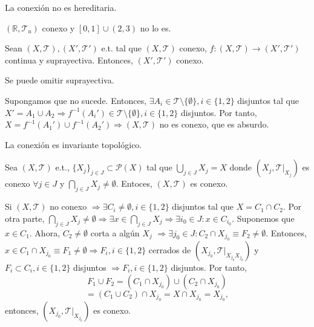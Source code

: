 \begin{obs}
  La conexión no es hereditaria.
\end{obs}

\begin{ejm}
  $( \mathbb{R}, \mathcal{T}_{u} )$ conexo y $[ 0, 1 ] \cup (2, 3)$ no lo es.
\end{ejm}

\begin{prop}
  Sean $( X, \mathcal{T} ), ( X', \mathcal{T}' )$ e.t. tal que $( X, \mathcal{T} )$ conexo, $f : ( X, \mathcal{T} ) \to ( X', \mathcal{T}' )$ continua y suprayectiva. Entonces, $( X', \mathcal{T}' )$ conexo.
\end{prop}

\begin{obs}
  Se puede omitir suprayectiva.
\end{obs}

\begin{dem}
  Supongamos que no sucede. Entonces, $\exists A_{i} \in \mathcal{T} \setminus \{  \emptyset \}, i \in \{ 1, 2 \}$ disjuntos tal que $X' = A_{1} \cup A_{2} \Rightarrow f^{-1}(A_{i}') \in \mathcal{T} \setminus \{  \emptyset \}, i \in \{ 1, 2 \}$ disjuntos. Por tanto, $X = f^{-1}(A_{1}') \cup f^{-1}(A_{2}') \Rightarrow ( X, \mathcal{T} )$ no es conexo, que es absurdo.
\end{dem}

\begin{cor}
  La conexión es invariante topológico.
\end{cor}

\begin{prop}
  Sea $( X, \mathcal{T} )$ e.t., $\{ X_{j} \}_{j \in J} \subset \mathcal{P}(X)$ tal que $\bigcup_{j \in J} X_{j} = X$ donde $( X_{j}, \mathcal{T}|_{X_{j}})$ es conexo $\forall j \in J$ y $\bigcap_{j \in J} X_{j} \neq \emptyset$. Entoces, $( X, \mathcal{T} )$ es conexo.
\end{prop}

\begin{dem}
  Si $( X, \mathcal{T} )$ no conexo $\Rightarrow \exists C_{i} \neq \emptyset, i \in \{ 1, 2 \}$ disjuntos tal que $X = C_{1} \cap C_{2}$. Por otra parte, $\bigcap_{j \in J} X_{j} \neq \emptyset \Rightarrow \exists x \in \bigcap_{j \in J} X_{j} \Rightarrow \exists i_{0} \in J : x \in C_{i_{0}}$. Suponemos que $ x \in C_{1}$. Ahora, $C_{2} \neq \emptyset $ corta a algún $X_{j}$ $\Rightarrow \exists j_{0} \in J : C_{2} \cap X_{j_{0}} \equiv F_{2} \neq \emptyset $. Entonces, $x \in C_{1} \cap X_{j_{0}} \equiv F_{1} \neq \emptyset \Rightarrow F_{i}, i \in \{ 1, 2  \}$ cerrados de $( X_{j_{0}}, \mathcal{T}|_{X_{j_{0}}X_{j_{0}}})$ y $F_{i} \subset C_{i}, i \in \{ 1, 2 \}$ disjuntos $\Rightarrow F_{i}, i \in \{ 1, 2 \}$ disjuntos. Por tanto,
  \[
    F_{1} \cup F_{2} = (C_{1} \cap X_{j_{0}}) \cup (C_{2} \cap X_{j_{0}})
  \]
  \[ 
    = (C_{1} \cup C_{2}) \cap X_{j_{0}} = X \cap X_{j_{0}} = X_{j_{0}},
  \] 
  entonces, $( X_{j_{0}}, \mathcal{T}|_{X_{j_{0}}})$ es conexo.
\end{dem}
